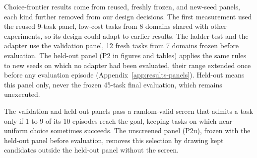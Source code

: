 Choice-frontier results come from reused, freshly frozen, and new-seed panels, each kind further removed from our design decisions. The first measurement used the reused 9-task panel, low-cost tasks from 8 domains shared with other experiments, so its design could adapt to earlier results.
The ladder test and the adapter use the validation panel, 12 fresh tasks from 7 domains frozen before evaluation.
The held-out panel (P2 in figures and tables) applies the same rules to new seeds on which no adapter had been evaluated, their range extended once before any evaluation episode (Appendix~\ref{app:results-panels}). Held-out means this panel only, never the frozen 45-task final evaluation, which remains unexecuted.

The validation and held-out panels pass a random-valid screen that admits a task only if 1 to 9 of its 10 episodes reach the goal, keeping tasks on which near-uniform choice sometimes succeeds. The unscreened panel (P2u), frozen with the held-out panel before evaluation, removes this selection by drawing kept candidates outside the held-out panel without the screen.

